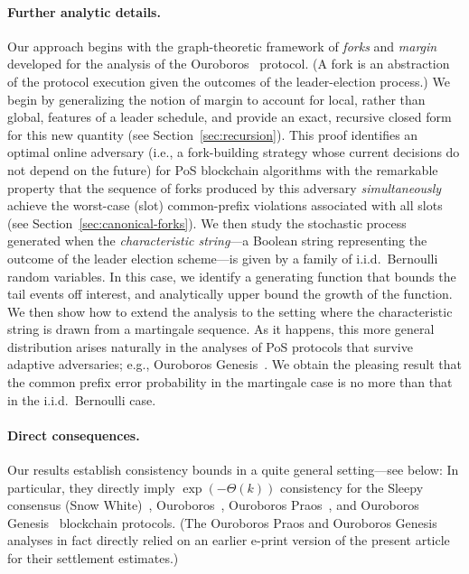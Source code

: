\paragraph{Further analytic details.} Our approach begins with the
graph-theoretic framework of \emph{forks} and \emph{margin} developed
for the analysis of the Ouroboros~\cite{KRDO17} protocol.  (A fork is
an abstraction of the protocol execution given the outcomes of the
leader-election process.)  We begin by generalizing the notion of
margin to account for local, rather than global, features of a leader
schedule, and provide an exact, recursive closed form for this new
quantity (see Section~\ref{sec:recursion}). This proof identifies an
optimal online adversary (i.e., a fork-building strategy whose current
decisions do not depend on the future) for PoS blockchain algorithms
with the remarkable property that the sequence of forks produced by
this adversary \emph{simultaneously} achieve the worst-case (slot)
common-prefix violations associated with all slots (see
Section~\ref{sec:canonical-forks}). We then study the stochastic
process generated when the \emph{characteristic string}---a Boolean
string representing the outcome of the leader election scheme---is
given by a family of i.i.d.\ Bernoulli random variables. In this case,
we identify a generating function that bounds the tail events off
interest, and analytically upper bound the growth of the function. We
then show how to extend the analysis to the setting where the
characteristic string is drawn from a martingale sequence.  As it
happens, this more general distribution arises naturally in the
analyses of PoS protocols that survive adaptive adversaries; e.g.,
Ouroboros Genesis~\cite{DBLP:journals/iacr/BadertscherGKRZ18}.  We
obtain the pleasing result that the common prefix error probability in
the martingale case is no more than that in the i.i.d.\ Bernoulli
case.

\paragraph{Direct consequences.} 
Our results establish consistency bounds in a quite general
setting---see below: In particular, they directly imply
$\exp(-\Theta(k))$ consistency for the Sleepy consensus (Snow
White)~\cite{DBLP:conf/asiacrypt/PassS17}, Ouroboros~\cite{KRDO17},
Ouroboros Praos~\cite{DBLP:conf/eurocrypt/DavidGKR18}, and Ouroboros
Genesis~\cite{DBLP:journals/iacr/BadertscherGKRZ18} blockchain
protocols. (The Ouroboros Praos and Ouroboros Genesis analyses in fact
directly relied on an earlier e-print version of the present article
for their settlement estimates.)

